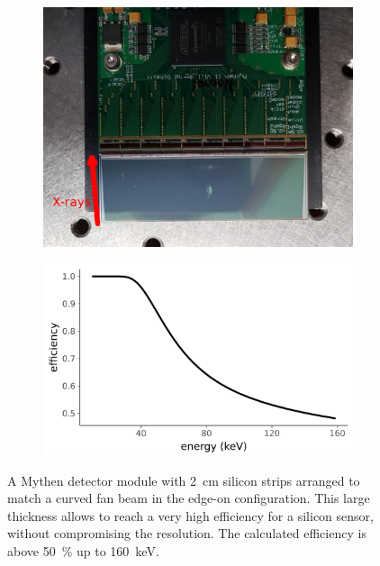 \begin{figure}[htb]
    \centering
    \begin{subfigure}[b]{.49\textwidth}
    \centering
    \includegraphics[width=\textwidth]{gfx/mythen-edge-on/mythen.png}
    \caption{}
    \end{subfigure}
    \begin{subfigure}[b]{.49\textwidth}
    \centering
    \includegraphics[width=\textwidth]{gfx/mythen-edge-on/efficiency.png}
    \caption{}
    \end{subfigure}
    \caption{A Mythen detector module with \SI{2}{\centi\meter} silicon
strips arranged to match a curved fan beam in the edge-on configuration.
This large thickness allows to reach a very high efficiency for a silicon
sensor, without compromising the resolution. The calculated efficiency is above
\SI{50}{\percent} up to \SI{160}{\kilo\eV}.}
    \label{fig:mythen-edge-on}
\end{figure}

